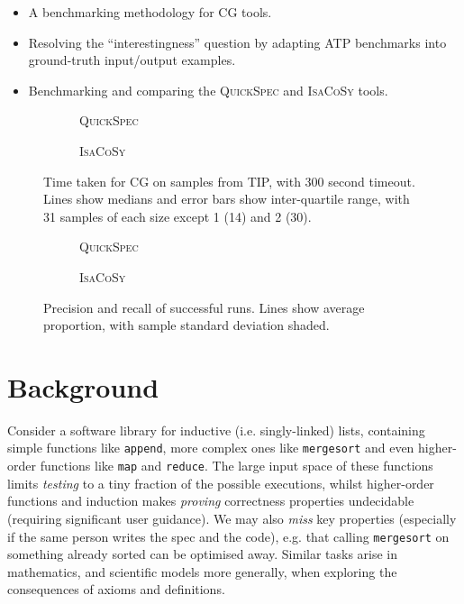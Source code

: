 \documentclass[]{default}
\begin{document}
\begin{itemize}
\item A benchmarking methodology for CG tools.
\item Resolving the ``interestingness'' question by adapting ATP benchmarks into
  ground-truth input/output examples.
\item Benchmarking and comparing the \textsc{QuickSpec} and \textsc{IsaCoSy}
  tools.
\end{itemize}

\begin{figure}
  \begin{subfigure}{.5\textwidth}
    \centering
    
    \caption{\textsc{QuickSpec}}
  \end{subfigure}
  \begin{subfigure}{.5\textwidth}
    \centering
    
    \caption{\textsc{IsaCoSy}}
  \end{subfigure}

  \caption{Time taken for CG on samples from TIP, with 300 second timeout. Lines
    show medians and error bars show inter-quartile range, with 31 samples of
    each size except 1 (14) and 2 (30). }
  \label{figure:quickspec_runtimes}
\end{figure}

\begin{figure*}
  \begin{subfigure}{.5\textwidth}
    \centering
    
    \caption{\textsc{QuickSpec}}
  \end{subfigure}%
  \begin{subfigure}{.5\textwidth}
    \centering
    
    \caption{\textsc{IsaCoSy}}
  \end{subfigure}

  \caption{Precision and recall of successful runs. Lines show average
    proportion, with sample standard deviation shaded.}
  \label{figure:quickspec_precRec}
\end{figure*}

\section{Background}

Consider a software library for inductive (i.e. singly-linked) lists, containing
simple functions like \texttt{append}, more complex ones like \texttt{mergesort}
and even higher-order functions like \texttt{map} and \texttt{reduce}. The large
input space of these functions limits \emph{testing} to a tiny fraction of the
possible executions, whilst higher-order functions and induction makes
\emph{proving} correctness properties undecidable (requiring significant user
guidance). We may also \emph{miss} key properties (especially if the same person
writes the spec and the code), e.g. that calling \texttt{mergesort} on something
already sorted can be optimised away. Similar tasks arise in mathematics, and
scientific models more generally, when exploring the consequences of axioms and
definitions.
\end{document}
